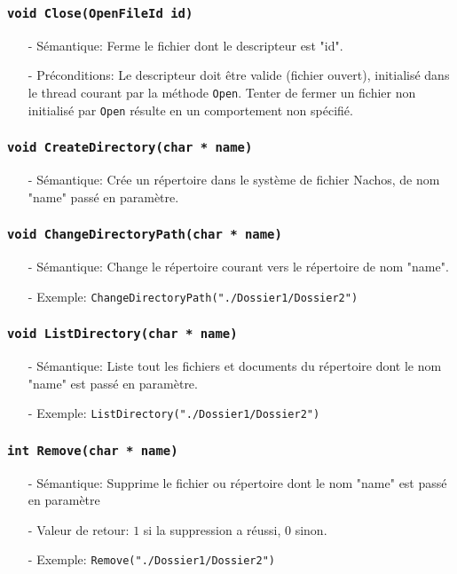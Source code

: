 \documentclass[11pt]{article}
\theoremstyle{definition}
\theoremstyle{definition}
\begin{document}
\subsubsection{\texttt{void Close(OpenFileId id)}}
\begin{itemize}
\item[-]Sémantique: Ferme le fichier dont le descripteur est "id".
\item[-]Préconditions: Le descripteur doit être valide (fichier ouvert), initialisé dans le thread courant
  par la méthode \texttt{Open}. Tenter de fermer un fichier non initialisé par \texttt{Open} résulte en un comportement non spécifié.
\end{itemize}

\subsubsection{\texttt{void CreateDirectory(char * name)}}
\begin{itemize}
\item[-]Sémantique: Crée un répertoire dans le système de fichier Nachos, de nom "name"
  passé en paramètre.
\end{itemize}

\subsubsection{\texttt{void ChangeDirectoryPath(char * name)}}
\begin{itemize}
\item[-]Sémantique: Change le répertoire courant vers le répertoire de nom "name".
\item[-]Exemple: \texttt{ChangeDirectoryPath("./Dossier1/Dossier2")}
\end{itemize}

\subsubsection{\texttt{void ListDirectory(char * name)}}
\begin{itemize}
\item[-]Sémantique: Liste tout les fichiers et documents du répertoire dont le nom "name"
  est passé en paramètre.
\item[-]Exemple: \texttt{ListDirectory("./Dossier1/Dossier2")}
\end{itemize}

 \subsubsection{\texttt{int Remove(char * name)}}
\begin{itemize}
\item[-]Sémantique: Supprime le fichier ou répertoire dont le nom "name" est passé en paramètre
\item[-]Valeur de retour: $1$ si la suppression a réussi, $0$ sinon.
\item[-]Exemple: \texttt{Remove("./Dossier1/Dossier2")}
\end{itemize}
\end{document}
